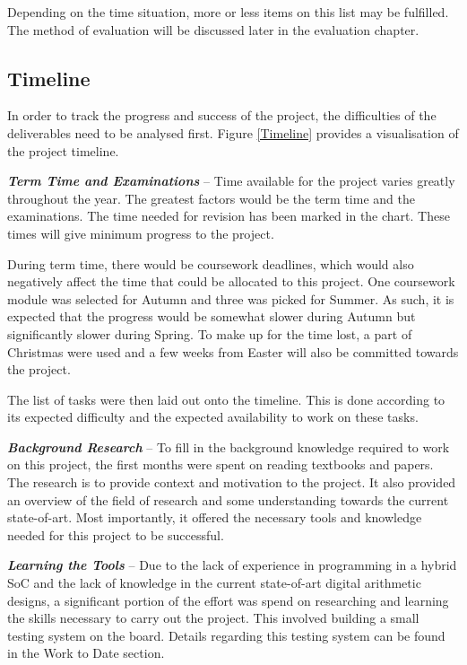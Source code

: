 Depending on the time situation, more or less items on this list may be
fulfilled.
The method of evaluation will be discussed later in the evaluation chapter.

\subsection{Timeline}
\begin{figure*}
  \centering
  
  \caption{Project Timeline}
  \label{Timeline}
\end{figure*}

In order to track the progress and success of the project, the difficulties
of the deliverables need to be analysed first.
Figure \ref{Timeline} provides a visualisation of the project timeline.

\textit{\textbf{Term Time and Examinations}} --
Time available for the project varies greatly throughout the year.
The greatest factors would be the term time and the examinations.
The time needed for revision has been marked in the chart.
These times will give minimum progress to the project.

During term time, there would be coursework deadlines, which would also
negatively affect the time that could be allocated to this project.
One coursework module was selected for Autumn and three was picked for Summer.
As such, it is expected that the progress would be somewhat slower during Autumn
but significantly slower during Spring.
To make up for the time lost, a part of Christmas were used and a few weeks
from Easter will also be committed towards the project.

The list of tasks were then laid out onto the timeline.
This is done according to its expected difficulty and the expected availability
to work on these tasks.

\textit{\textbf{Background Research}} --
To fill in the background knowledge required to work on this project, the first
months were spent on reading textbooks and papers.
The research is to provide context and motivation to the project.
It also provided an overview of the field of research and some understanding
towards the current state-of-art.
Most importantly, it offered the necessary tools and knowledge needed for this
project to be successful.

\textit{\textbf{Learning the Tools}} --
Due to the lack of experience in programming in a hybrid SoC and the lack of
knowledge in the current state-of-art digital arithmetic designs, a significant
portion of the effort was spend on researching and learning the skills
necessary to carry out the project.
This involved building a small testing system on the board.
Details regarding this testing system can be found in the Work to Date section.

